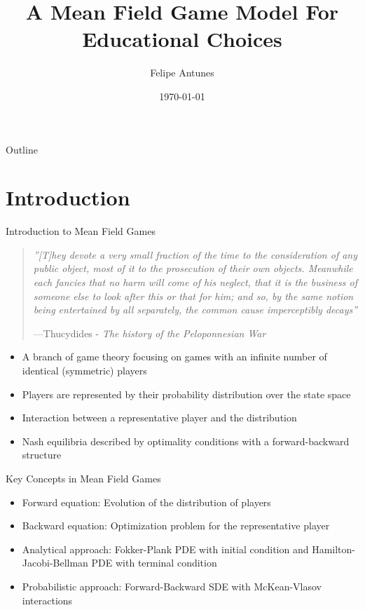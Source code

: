 \documentclass{beamer}
\title[A Mean Field Game Model For Educational Choices]{A Mean Field Game Model For Educational Choices}
\author{Felipe Antunes}
\institute{}
\date{\today}
\begin{document}
\begin{frame}
\titlepage
\end{frame}

\begin{frame}{Outline}
\tableofcontents
\end{frame}

\section{Introduction}

\begin{frame}{Introduction to Mean Field Games}
\begin{quote}
\itshape ''[T]hey devote a very small fraction of the time to the consideration of any public object, most of it to the prosecution of their own objects. Meanwhile each fancies that no harm will come of his neglect, that it is the business of someone else to look after this or that for him; and so, by the same notion being entertained by all separately, the common cause imperceptibly decays''

\normalfont ---Thucydides - \textit{The history of the Peloponnesian War}
\end{quote}

\begin{itemize}
    \item A branch of game theory focusing on games with an infinite number of identical (symmetric) players
    \item Players are represented by their probability distribution over the state space
    \item Interaction between a representative player and the distribution
    \item Nash equilibria described by optimality conditions with a forward-backward structure
\end{itemize}
\end{frame}

\begin{frame}{Key Concepts in Mean Field Games}
\begin{itemize}
    \item Forward equation: Evolution of the distribution of players
    \item Backward equation: Optimization problem for the representative player
    \item Analytical approach: Fokker-Plank PDE with initial condition and Hamilton-Jacobi-Bellman PDE with terminal condition
    \item Probabilistic approach: Forward-Backward SDE with McKean-Vlasov interactions
\end{itemize}
\end{frame}
\end{document}
